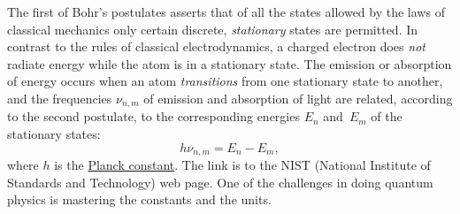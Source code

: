 \documentclass[12pt]{article}
\begin{document}
The first of Bohr's postulates asserts that of all the states allowed by the laws of classical mechanics only certain discrete, \textit{stationary} states are permitted. In contrast to the rules of classical electrodynamics, a charged electron does \textit{not} radiate energy while the atom is in a stationary state. The emission or absorption of energy occurs when an atom \textit{transitions} from one stationary state to another, and the frequencies $\nu_{n,m}$ of emission and absorption of light are related, according to the second postulate, to the corresponding energies $E_n$ and~$E_m$ of the stationary states: 
\begin{equation}\label{Bohr_frequency_relation}
    h \nu_{n,m} = E_n-E_m,
\end{equation}
where $h$ is the \href{https://www.nist.gov/physics/explainers/planck-constant}{Planck constant}.  The link is to the NIST (National Institute of Standards and Technology) web page.  One of the challenges in doing quantum physics is mastering the constants and the units.
\end{document}
